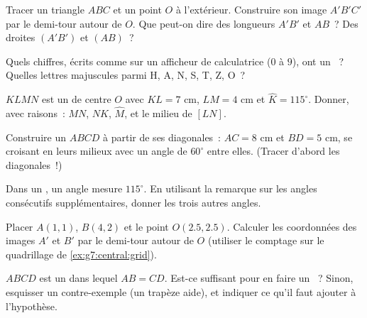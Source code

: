 \begin{exercise}[$\star$]\label{exo:g7:central:2}
Tracer un triangle $ABC$ et un point $O$ à l'extérieur. Construire
son image $A'B'C'$ par le demi-tour autour de $O$. Que peut-on dire
des longueurs $A'B'$ et $AB$~? Des droites $(A'B')$ et $(AB)$~?
\end{exercise}

\begin{exercise}[$\star$]\label{exo:g7:central:3}
Quels chiffres, écrits comme sur un afficheur de calculatrice ($0$ à
$9$), ont un ~? Quelles lettres majuscules parmi H,
A, N, S, T, Z, O~?
\end{exercise}

\begin{exercise}[$\star$]\label{exo:g7:central:4}
$KLMN$ est un  de centre $O$ avec $KL = 7$ cm,
$LM = 4$ cm et $\widehat K = 115^\circ$. Donner, avec raisons~: $MN$,
$NK$, $\widehat M$, et le milieu de $[LN]$.
\end{exercise}

\begin{exercise}[$\star$]\label{exo:g7:central:5}
Construire un  $ABCD$ à partir de ses diagonales~:
$AC = 8$ cm et $BD = 5$ cm, se croisant en leurs milieux avec un
angle de $60^\circ$ entre elles. (Tracer d'abord les diagonales~!)
\end{exercise}

\begin{exercise}[$\star$]\label{exo:g7:central:6}
Dans un , un angle mesure $115^\circ$. En utilisant la
remarque sur les angles consécutifs supplémentaires, donner les trois
autres angles.
\end{exercise}

\begin{exercise}[$\star\star$]\label{exo:g7:central:7}
Placer $A(1, 1)$, $B(4, 2)$ et le point $O(2.5, 2.5)$. Calculer les
coordonnées des images $A'$ et $B'$ par le demi-tour autour de $O$
(utiliser le comptage sur le quadrillage de
\cref{ex:g7:central:grid}).
\end{exercise}

\begin{exercise}[$\star\star$]\label{exo:g7:central:8}
$ABCD$ est un  dans lequel $AB = CD$. Est-ce suffisant
pour en faire un ~? Sinon, esquisser un
contre-exemple (un trapèze  aide), et indiquer ce qu'il faut
ajouter à l'hypothèse.
\end{exercise}

